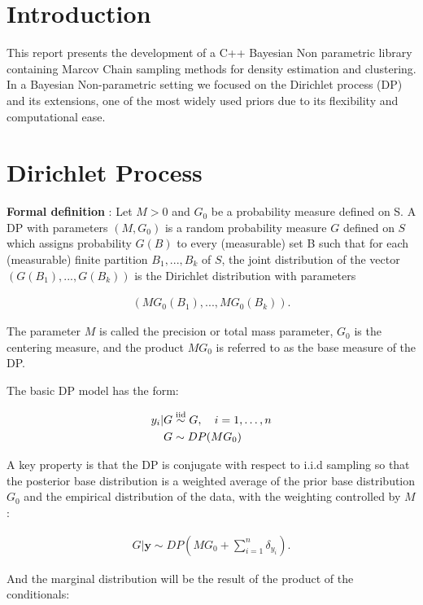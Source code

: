 
 
 
\section{Introduction}
This report presents the development of a C++ Bayesian Non parametric library containing Marcov Chain sampling methods for density estimation and clustering. In a Bayesian Non-parametric setting we focused on the Dirichlet process (DP) and its extensions, one of the most widely used priors due to its flexibility and computational ease.

\section{Dirichlet Process}
\textbf{Formal definition} : Let $M>0$ and $G_0$ be a probability measure defined on S. A DP with parameters $(M,G_0)$ is a random probability measure $G$ defined on $S$ which assigns probability $G(B)$ to every (measurable) set B such that for each (measurable) finite partition ${B_1,...,B_k}$ of $S$, the joint distribution of the  vector $(G(B_1),...,G(B_k))$ is the Dirichlet distribution with parameters 

\begin{align}
(MG_0(B_1),...,MG_0(B_k)).
\end{align}

The parameter $M$ is called the precision or total mass parameter, $G_0$ is
the centering measure, and the product $MG_0$ is referred to as the base measure
of the DP.

The basic DP model has the form:

\begin{align*}
		y_i | G &\stackrel{\text{iid}}{\sim} G, \quad i=1,\dots,n \\
		G &\sim DP(MG_0)
\end{align*}



A key property is that the DP is conjugate with respect to i.i.d sampling so that
the posterior base distribution is a weighted average of the prior base distribution $G_0$ and the empirical distribution of the data, with the weighting controlled by $M$ :

\begin{align}
	G | \mathbf{y} \sim DP(M G_0 + \sum_{i=1}^n \delta_{y_i}) .
\end{align}

And the marginal distribution will be the result of the product of the conditionals:

